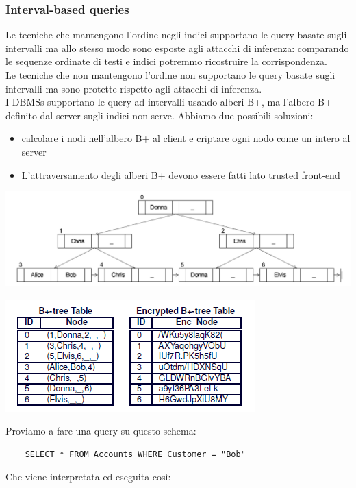 \subsubsection{Interval-based queries}
Le tecniche che mantengono l'ordine negli indici supportano le query basate sugli intervalli ma allo stesso modo sono esposte agli attacchi di inferenza: comparando le sequenze ordinate di testi e indici potremmo ricostruire la corrispondenza.\\
Le tecniche che non mantengono l'ordine non supportano le query basate sugli intervalli ma sono protette rispetto agli attacchi di inferenza.\\
I DBMSs supportano le query ad intervalli usando alberi B+, ma l'albero B+ definito dal server sugli indici non serve. Abbiamo due possibili soluzioni:
\begin{itemize}
    \item calcolare i nodi nell'albero B+ al client e criptare ogni nodo come un intero al server
    \item L'attraversamento degli alberi B+ devono essere fatti lato trusted front-end
\end{itemize}
\begin{center}
    \includegraphics[scale=0.4]{img/btree.png}
\end{center}
\begin{center}
    \includegraphics[scale=0.6]{img/tabtree.png}
\end{center}
Proviamo a fare una query su questo schema: 
\begin{verbatim}
    SELECT * FROM Accounts WHERE Customer = "Bob"
\end{verbatim}
Che viene interpretata ed eseguita così:
